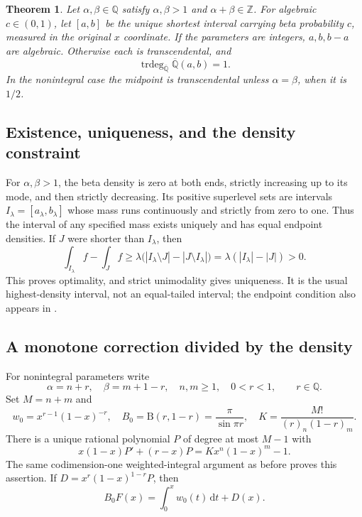 \documentclass[11pt,a4paper]{article}
\numberwithin{equation}{section}
\newtheorem{theorem}{Theorem}[section]
\theoremstyle{definition}
\theoremstyle{remark}
\newcommand{\Q}{\mathbb Q}
\newcommand{\Qb}{\overline{\mathbb Q}}
\newcommand{\Z}{\mathbb Z}
\newcommand{\B}{\mathrm B}
\newcommand{\trdeg}{\operatorname{trdeg}}
\newcommand{\dd}{\,\mathrm d}
\begin{document}
\begin{theorem}\label{thm:hpd}
Let $\alpha,\beta\in\Q$ satisfy $\alpha,\beta>1$ and
$\alpha+\beta\in\Z$. For algebraic $c\in(0,1)$, let $[a,b]$ be the
unique shortest interval carrying beta probability $c$, measured in the
original $x$ coordinate. If the parameters are integers, $a,b,b-a$ are
algebraic. Otherwise each is transcendental, and
\[
 \trdeg_{\Qb}\Qb(a,b)=1.
\]
In the nonintegral case the midpoint is transcendental unless
$\alpha=\beta$, when it is $1/2$.
\end{theorem}

\subsection{Existence, uniqueness, and the density constraint}
For $\alpha,\beta>1$, the beta density is zero at both ends, strictly
increasing up to its mode, and then strictly decreasing. Its positive
superlevel sets are intervals $I_\lambda=[a_\lambda,b_\lambda]$ whose
mass runs continuously and strictly from zero to one. Thus the interval
of any specified mass exists uniquely and has equal endpoint densities.
If $J$ were shorter than $I_\lambda$, then
\[
 \int_{I_\lambda}f-\int_Jf
 \ge\lambda\bigl(|I_\lambda\setminus J|-|J\setminus I_\lambda|\bigr)
 =\lambda(|I_\lambda|-|J|)>0.
\]
This proves optimality, and strict unimodality gives uniqueness. It is the
usual highest-density interval, not an equal-tailed interval; the endpoint
condition also appears in \cite{Lourie}.

\subsection{A monotone correction divided by the density}
For nonintegral parameters write
\[
 \alpha=n+r,\quad\beta=m+1-r,\quad n,m\ge1,\quad0<r<1,
 \qquad r\in\Q.
\]
Set $M=n+m$ and
\[
 w_0=x^{r-1}(1-x)^{-r},\quad
 B_0=\B(r,1-r)=\frac\pi{\sin\pi r},\quad
 K=\frac{M!}{(r)_n(1-r)_m}.
\]
There is a unique rational polynomial $P$ of degree at most $M-1$ with
\begin{equation}\label{eq:hpd-P}
 x(1-x)P'+(r-x)P=Kx^n(1-x)^m-1.
\end{equation}
The same codimension-one weighted-integral argument as before proves this
assertion. If $D=x^r(1-x)^{1-r}P$, then
\begin{equation}\label{eq:hpd-decomp}
 B_0F(x)=\int_0^xw_0(t)\dd t+D(x).
\end{equation}
\end{document}
